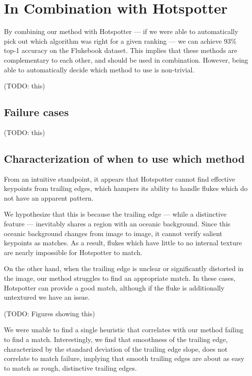 \section{In Combination with Hotspotter}

By combining our method with Hotspotter --- if we were able to automatically pick out which algorithm was right for a given ranking --- we can achieve 93\% top-1 accuracy on the Flukebook dataset.
This implies that these methods are complementary to each other, and should be used in combination.
However, being able to automatically decide which method to use is non-trivial.

(TODO: this)

\subsection{Failure cases}

(TODO: this)

\subsection{Characterization of when to use which method}

From an intuitive standpoint, it appears that Hotspotter cannot find effective keypoints from trailing edges, which hampers its ability to handle flukes which do not have an apparent pattern.

We hypothesize that this is because the trailing edge --- while a distinctive feature --- inevitably shares a region with an oceanic background.
Since this oceanic background changes from image to image, it cannot verify salient keypoints as matches.
As a result, flukes which have little to no internal texture are nearly impossible for Hotspotter to match.

On the other hand, when the trailing edge is unclear or significantly distorted in the image, our method struggles to find an appropriate match.
In these cases, Hotspotter can provide a good match, although if the fluke is additionally untextured we have an issue.

(TODO: Figures showing this)

We were unable to find a single heuristic that correlates with our method failing to find a match.
Interestingly, we find that smoothness of the trailing edge, characterized by the standard deviation of the trailing edge slope, does not correlate to match failure, implying that smooth trailing edges are about as easy to match as rough, distinctive trailing edges.

